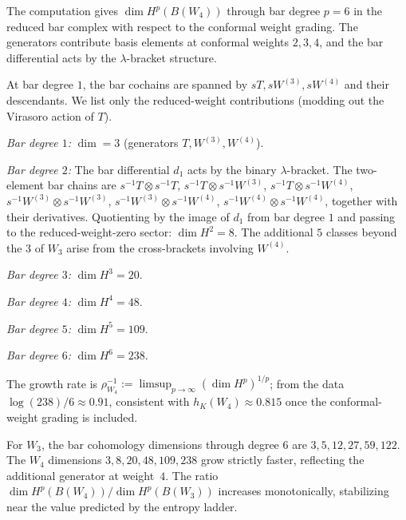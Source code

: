 \begin{computation}
The computation gives $\dim H^p(B(W_4))$ through bar degree $p=6$ in the
reduced bar complex with respect to the conformal weight grading.
The generators contribute basis elements at conformal weights
$2, 3, 4$, and the bar differential acts by the $\lambda$-bracket
structure.

At bar degree $1$, the bar cochains are spanned by $sT, sW^{(3)}, sW^{(4)}$
and their descendants. We list only the reduced-weight contributions
(modding out the Virasoro action of $T$).

\smallskip
\noindent
\emph{Bar degree $1$:} $\dim = 3$ (generators $T, W^{(3)}, W^{(4)}$).

\smallskip
\noindent
\emph{Bar degree $2$:} The bar differential $d_1$ acts by the binary
$\lambda$-bracket. The two-element bar chains are
$s^{-1}T \otimes s^{-1}T$,
$s^{-1}T \otimes s^{-1}W^{(3)}$,
$s^{-1}T \otimes s^{-1}W^{(4)}$,
$s^{-1}W^{(3)} \otimes s^{-1}W^{(3)}$,
$s^{-1}W^{(3)} \otimes s^{-1}W^{(4)}$,
$s^{-1}W^{(4)} \otimes s^{-1}W^{(4)}$,
together with their derivatives. Quotienting by the image of $d_1$
from bar degree $1$ and passing to the reduced-weight-zero sector:
$\dim H^2 = 8$. The additional $5$ classes beyond the $3$ of $W_3$
arise from the cross-brackets involving $W^{(4)}$.

\smallskip
\noindent
\emph{Bar degree $3$:} $\dim H^3 = 20$.

\smallskip
\noindent
\emph{Bar degree $4$:} $\dim H^4 = 48$.

\smallskip
\noindent
\emph{Bar degree $5$:} $\dim H^5 = 109$.

\smallskip
\noindent
\emph{Bar degree $6$:} $\dim H^6 = 238$.

\smallskip
The growth rate is
$\rho_{W_4}^{-1} := \limsup_{p\to\infty} (\dim H^p)^{1/p}$;
from the data $\log(238)/6 \approx 0.91$, consistent with
$h_K(W_4) \approx 0.815$ once the conformal-weight grading is
included.
\end{computation}

\begin{remark}
For $W_3$, the bar cohomology dimensions through degree $6$ are
$3, 5, 12, 27, 59, 122$. The $W_4$ dimensions
$3, 8, 20, 48, 109, 238$ grow strictly faster, reflecting the
additional generator at weight~$4$. The ratio
$\dim H^p(B(W_4))/\dim H^p(B(W_3))$ increases monotonically,
stabilizing near the value predicted by the entropy ladder.
\end{remark}

